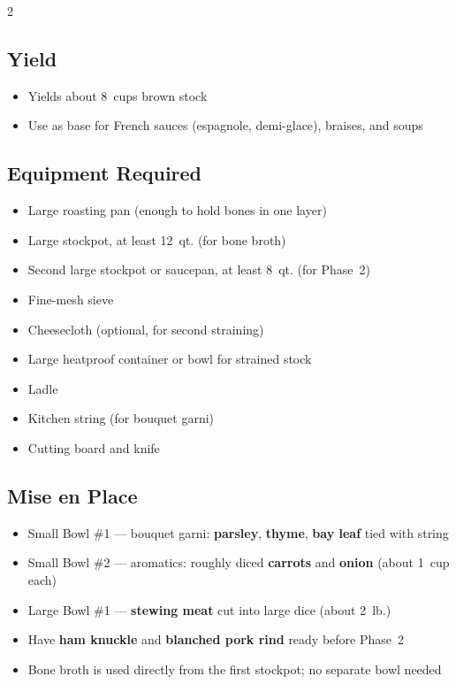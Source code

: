 \documentclass[11pt,letterpaper]{article}
\begin{document}
{\footnotesize
\setlength{\columnsep}{20pt}
\setlength{\multicolsep}{6pt}
\begin{multicols}{2}
\setlength{\parindent}{0pt}
\setlength{\parskip}{4pt}
\setlength{\itemsep}{0pt}
\setlength{\parsep}{0pt}

\subsection*{Yield}
\begin{itemize}
    \item Yields about 8~cups brown stock
    \item Use as base for French sauces (espagnole, demi-glace), braises, and soups
\end{itemize}

\subsection*{Equipment Required}
\begin{itemize}
    \item Large roasting pan (enough to hold bones in one layer)
    \item Large stockpot, at least 12~qt. (for bone broth)
    \item Second large stockpot or saucepan, at least 8~qt. (for Phase~2)
    \item Fine-mesh sieve
    \item Cheesecloth (optional, for second straining)
    \item Large heatproof container or bowl for strained stock
    \item Ladle
    \item Kitchen string (for bouquet garni)
    \item Cutting board and knife
\end{itemize}

\subsection*{Mise en Place}
\begin{itemize}
    \item Small Bowl \#1 --- bouquet garni: \textbf{parsley}, \textbf{thyme}, \textbf{bay leaf} tied with string
    \item Small Bowl \#2 --- aromatics: roughly diced \textbf{carrots} and \textbf{onion} (about 1~cup each)
    \item Large Bowl \#1 --- \textbf{stewing meat} cut into large dice (about 2~lb.)
    \item Have \textbf{ham knuckle} and \textbf{blanched pork rind} ready before Phase~2
    \item Bone broth is used directly from the first stockpot; no separate bowl needed
\end{itemize}


\end{multicols}}
\end{document}
